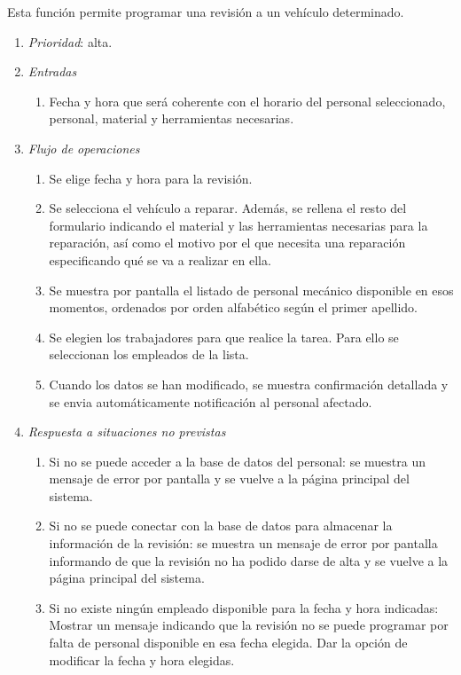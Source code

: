 

	Esta función permite programar una revisión a un vehículo determinado.

\begin{enumerate}
	\item \textit{Prioridad}: alta.
	\item \textit{Entradas}
	\begin{enumerate}
		\item Fecha y hora que será coherente con el horario del personal seleccionado, personal, material y herramientas necesarias.
	\end{enumerate}
	\item \textit{Flujo de operaciones}
	\begin{enumerate}
		\item Se elige fecha y hora para la revisión. 
		\item Se selecciona el vehículo a reparar. Además, se rellena el resto del formulario indicando el material y las herramientas necesarias para la reparación, así como el motivo por el que necesita una reparación especificando qué se va a realizar en ella.
		\item Se muestra por pantalla el listado de personal mecánico disponible en esos momentos, ordenados por orden alfabético según el primer apellido. 
		\item Se elegien los trabajadores para que realice la tarea. Para ello se seleccionan los empleados de la lista.
		\item Cuando los datos se han modificado, se muestra confirmación detallada y se envia automáticamente notificación al personal afectado.
	\end{enumerate}
	\item \textit{Respuesta a situaciones no previstas}
	\begin{enumerate}
		\item Si no se puede acceder a la base de datos del personal: se muestra un mensaje de error por pantalla y se vuelve a la página principal del sistema.
		\item Si no se puede conectar con la base de datos para almacenar la información de la revisión: se muestra un mensaje de error por pantalla informando de que la revisión no ha podido darse de alta y se vuelve a la página principal del sistema.
		\item Si no existe ningún empleado disponible para la fecha y hora indicadas: Mostrar un mensaje indicando que la revisión no se puede programar por falta de personal disponible en esa fecha elegida. Dar la opción de modificar la fecha y hora elegidas.
	\end{enumerate}

\end{enumerate}
